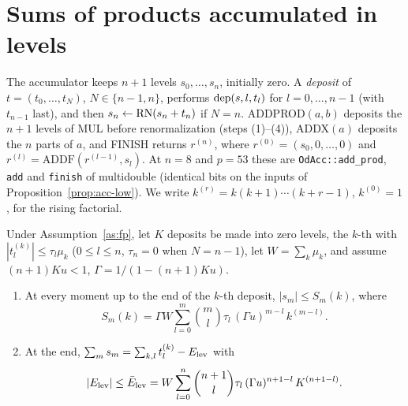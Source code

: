 
\section{Sums of products accumulated in levels}\label{sec:acc}

The accumulator keeps $n+1$ levels $s_0, \dots, s_n$, initially zero. A \emph{deposit} of $t = (t_0, \dots, t_N)$,
$N \in \{n-1, n\}$, performs $\mathrm{dep}(s, l, t_l)$ for $l = 0, \dots, n-1$ (with $t_{n-1}$ last), and then $s_n \gets
\mathrm{RN}(s_n + t_n)$ if $N = n$. ADDPROD$(a, b)$ deposits the $n+1$ levels of MUL before renormalization (steps (1)--(4)),
ADDX$(a)$ deposits the $n$ parts of $a$, and FINISH returns $r^{(n)}$, where $r^{(0)} = (s_0, 0, \dots, 0)$ and
$r^{(l)} = \mathrm{ADDF}(r^{(l-1)}, s_l)$. At $n = 8$ and $p = 53$ these are \texttt{OdAcc::add\_prod}, \texttt{add}
and \texttt{finish} of multidouble (identical bits on the inputs of Proposition~\ref{prop:acc-low}). We write
$k^{(r)} = k(k+1)\cdots(k+r-1)$, $k^{(0)} = 1$, for the rising factorial.

\begin{lemma}\label{lem:acc}
Under Assumption~\ref{as:fp}, let $K$ deposits be made into zero levels, the $k$-th with $|t^{(k)}_l| \le \tau_l\mu_k$ ($0 \le l
\le n$, $\tau_n = 0$ when $N = n - 1$), let $W = \sum_k \mu_k$, and assume $(n+1)Ku < 1$, $\Gamma = 1/(1 - (n+1)Ku)$.
\begin{enumerate}
\item[(a)] At every moment up to the end of the $k$-th deposit, $|s_m| \le S_m(k)$, where
\[
S_m(k) = \Gamma W\sum_{l=0}^{m}\binom{m}{l}\tau_l\,(\Gamma u)^{m-l}\,k^{(m-l)}.
\]
\item[(b)] At the end, $\sum_m s_m = \sum_{k,l} t^{(k)}_l - E_{\rm lev}$ with
\[
|E_{\rm lev}| \le \bar E_{\rm lev} = W\sum_{l=0}^{n}\binom{n+1}{l}\tau_l\,(\Gamma u)^{n+1-l}\,K^{(n+1-l)}.
\]
\end{enumerate}
\end{lemma}

